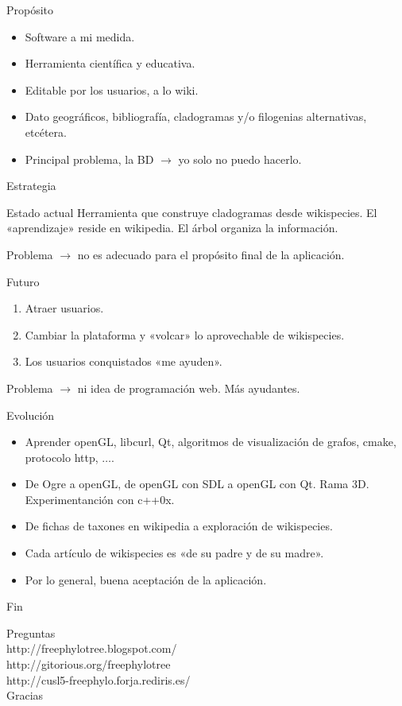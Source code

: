 \documentclass[green, compress]{beamer}
\begin{document}
\begin{frame}{Propósito}
\begin{itemize}
\item Software a mi medida.
\item Herramienta científica y educativa.
\item Editable por los usuarios, a lo wiki.
\item Dato geográficos, bibliografía, cladogramas y/o filogenias
  alternativas, etcétera.
\item Principal problema, la BD $\rightarrow$ yo solo no puedo hacerlo.
\end{itemize}
\end{frame}

\begin{frame}{Estrategia}
\begin{block}{Estado actual}
Herramienta que construye cladogramas desde wikispecies. El «aprendizaje» reside
en wikipedia. El árbol organiza la información.

Problema $\rightarrow$ no es adecuado para el propósito final de la aplicación.
\end{block}

\begin{block}{Futuro}
\begin{enumerate}
\item Atraer usuarios.
\item Cambiar la plataforma y «volcar» lo aprovechable de wikispecies.
\item Los usuarios conquistados «me ayuden».
\end{enumerate}

Problema $\rightarrow$ ni idea de programación web. Más ayudantes.
\end{block}
\end{frame}

\begin{frame}{Evolución}
\begin{itemize}
\item Aprender openGL, libcurl, Qt, algoritmos de visualización
  de grafos, cmake, protocolo http, $\ldots$.
\item De Ogre a openGL, de openGL con SDL a openGL con Qt. Rama
  3D. Experimentanción con c++0x.
\item De fichas de taxones en wikipedia a exploración de wikispecies.
\item Cada artículo de wikispecies es «de su padre y de su madre».
\item Por lo general, buena aceptación de la aplicación.
\end{itemize}
\end{frame}

\begin{frame}{Fin}
\begin{center}
\Huge{Preguntas}\\
\vspace*{2ex}
\tiny{http://freephylotree.blogspot.com/}\\
\tiny{http://gitorious.org/freephylotree}\\
\tiny{http://cusl5-freephylo.forja.rediris.es/}\\
\vspace*{5ex}
\Huge{Gracias}
\end{center}
\end{frame}
\end{document}

